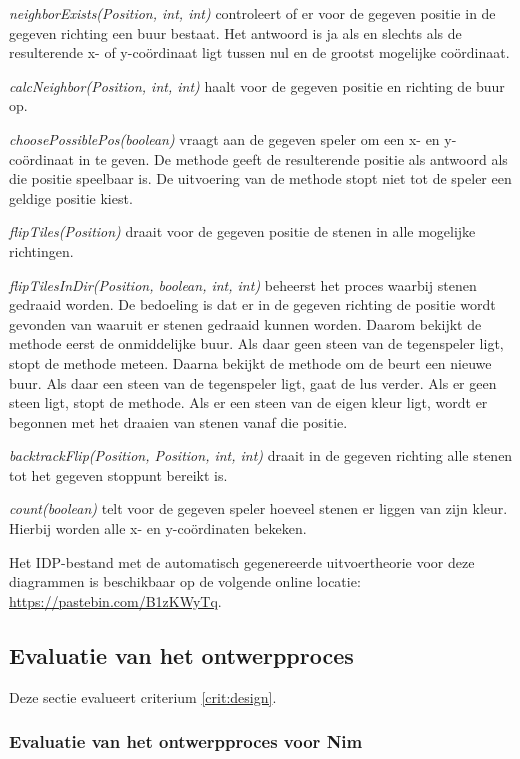 \textit{neighborExists(Position, int, int)} controleert of er voor de gegeven positie in de gegeven richting een buur bestaat. Het antwoord is ja als en slechts als de resulterende x- of y-co\"ordinaat ligt tussen nul en de grootst mogelijke co\"ordinaat.

\textit{calcNeighbor(Position, int, int)} haalt voor de gegeven positie en richting de buur op.

\textit{choosePossiblePos(boolean)} vraagt aan de gegeven speler om een x- en y-co\"ordinaat in te geven. De methode geeft de resulterende positie als antwoord als die positie speelbaar is. De uitvoering van de methode stopt niet tot de speler een geldige positie kiest.

\textit{flipTiles(Position)} draait voor de gegeven positie de stenen in alle mogelijke richtingen.

\textit{flipTilesInDir(Position, boolean, int, int)} beheerst het proces waarbij stenen gedraaid worden. De bedoeling is dat er in de gegeven richting de positie wordt gevonden van waaruit er stenen gedraaid kunnen worden. Daarom bekijkt de methode eerst de onmiddelijke buur. Als daar geen steen van de tegenspeler ligt, stopt de methode meteen. Daarna bekijkt de methode om de beurt een nieuwe buur. Als daar een steen van de tegenspeler ligt, gaat de lus verder. Als er geen steen ligt, stopt de methode. Als er een steen van de eigen kleur ligt, wordt er begonnen met het draaien van stenen vanaf die positie.

\textit{backtrackFlip(Position, Position, int, int)} draait in de gegeven richting alle stenen tot het gegeven stoppunt bereikt is.

\textit{count(boolean)} telt voor de gegeven speler hoeveel stenen er liggen van zijn kleur. Hierbij worden alle x- en y-co\"ordinaten bekeken.

Het IDP-bestand met de automatisch gegenereerde uitvoertheorie voor deze diagrammen is beschikbaar op de volgende online locatie: \url{https://pastebin.com/B1zKWyTq}.

\subsection{Evaluatie van het ontwerpproces}

Deze sectie evalueert criterium \ref{crit:design}.

\subsubsection{Evaluatie van het ontwerpproces voor Nim}

